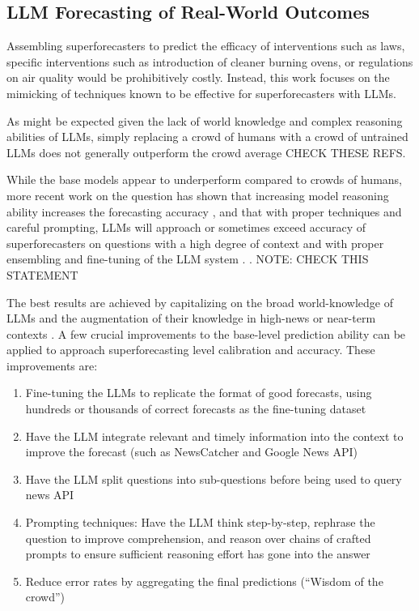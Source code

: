 \documentclass[12pt,a4paper]{article}
\begin{document}
\subsection{LLM Forecasting of Real-World Outcomes}

Assembling superforecasters to predict the efficacy of interventions such as laws, specific interventions such as introduction of cleaner burning ovens, or regulations on air quality would be prohibitively costly. Instead, this work focuses on the mimicking of techniques known to be effective for superforecasters with LLMs. 

As might be expected given the lack of world knowledge and complex reasoning abilities of LLMs, simply replacing a crowd of humans with a crowd of untrained LLMs does not generally outperform the crowd average   CHECK THESE REFS.

While the base models appear to underperform compared to crowds of humans, more recent work on the question has shown that increasing model reasoning ability increases the forecasting accuracy , and that with proper techniques and careful prompting, LLMs will approach or sometimes exceed accuracy of superforecasters on questions with a high degree of context and with proper ensembling and fine-tuning of the LLM system .   .  NOTE: CHECK THIS STATEMENT

The best results are achieved by capitalizing on the broad world-knowledge of LLMs and the augmentation of their knowledge in high-news or near-term contexts . A few crucial improvements to the base-level prediction ability can be applied to approach superforecasting level calibration and accuracy. These improvements are: 
\begin{enumerate}
\item Fine-tuning the LLMs to replicate the format of good forecasts, using hundreds or thousands of correct forecasts as the fine-tuning dataset
\item Have the LLM integrate relevant and timely information into the context to improve the forecast (such as NewsCatcher and Google News API)
\item Have the LLM split questions into sub-questions before being used to query news API
\item Prompting techniques: Have the LLM think step-by-step, rephrase the question to improve comprehension, and reason over chains of crafted prompts to ensure sufficient reasoning effort has gone into the answer
\item Reduce error rates by aggregating the final predictions (``Wisdom of the crowd'')
\end{enumerate}
\end{document}
